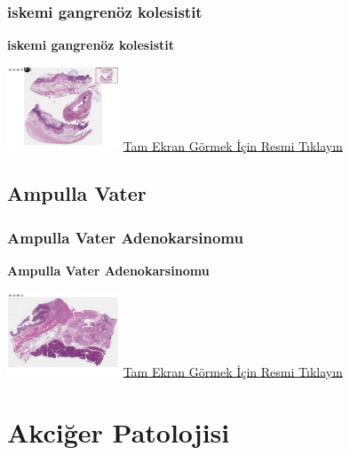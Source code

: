 \documentclass[
  letterpaper,
  DIV=11,
  numbers=noendperiod]{scrreprt}
\begin{document}
\hypertarget{sec-ischemia-gangrenous-cholecystitis}{%
\section{iskemi gangrenöz
kolesistit}\label{sec-ischemia-gangrenous-cholecystitis}}

\textbf{iskemi gangrenöz kolesistit}

\href{https://images.patolojiatlasi.com/ischemia-gangrenous-cholecystitis/HE.html}{\includegraphics[width=0.25\textwidth,height=\textheight]{./screenshots/ischemia-gangrenous-cholecystitis_screenshot.png}}
\href{https://images.patolojiatlasi.com/ischemia-gangrenous-cholecystitis/HE.html}{Tam
Ekran Görmek İçin Resmi Tıklayın}

\hypertarget{sec-ampulla-vater}{%
\chapter{Ampulla Vater}\label{sec-ampulla-vater}}

\hypertarget{sec-ampulla-vater-adenokarsinomu}{%
\section{Ampulla Vater
Adenokarsinomu}\label{sec-ampulla-vater-adenokarsinomu}}

\textbf{Ampulla Vater Adenokarsinomu}

\href{https://images.patolojiatlasi.com/ampullary-adenocarcinoma/HE.html}{\includegraphics[width=0.25\textwidth,height=\textheight]{./screenshots/ampullary-adenocarcinoma_screenshot.png}}
\href{https://images.patolojiatlasi.com/ampullary-adenocarcinoma/HE.html}{Tam
Ekran Görmek İçin Resmi Tıklayın}

\part{Akciğer Patolojisi}
\end{document}
